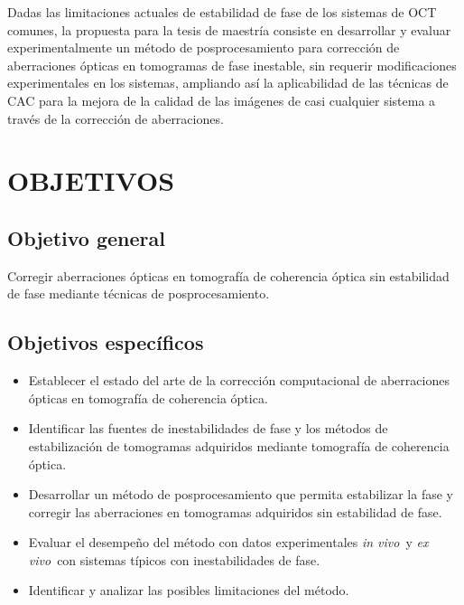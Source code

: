 \documentclass[letter, 12 pt]{article}
\newcommand{\invi}{\textit{in vivo}\ }
\newcommand{\exvi}{\textit{ex vivo}\ }
\begin{document}
Dadas las limitaciones actuales de estabilidad de fase de los sistemas de OCT comunes, la propuesta para la tesis de maestría consiste en desarrollar y evaluar experimentalmente un método de posprocesamiento para corrección de aberraciones ópticas en tomogramas de fase inestable, sin requerir modificaciones experimentales en los sistemas, ampliando así la aplicabilidad de las técnicas de CAC para la mejora de la calidad de las imágenes de casi cualquier sistema a través de la corrección de aberraciones.

\section{OBJETIVOS} \label{sec:objetivos}


\subsection{Objetivo general}

Corregir aberraciones ópticas en tomografía de coherencia óptica sin estabilidad de fase mediante técnicas de posprocesamiento.


\subsection{Objetivos específicos}

\begin{itemize}
    
    \item Establecer el estado del arte de la corrección computacional de aberraciones ópticas en tomografía de coherencia óptica.
    
    \item Identificar las fuentes de inestabilidades de fase y los métodos de estabilización de tomogramas adquiridos mediante tomografía de coherencia óptica.

    \item Desarrollar un método de posprocesamiento que permita estabilizar la fase y corregir las aberraciones en tomogramas adquiridos sin estabilidad de fase.
    
    \item Evaluar el desempeño del método con datos experimentales \invi y \exvi con sistemas típicos con inestabilidades de fase.
    
    \item Identificar y analizar las posibles limitaciones del método.
    
\end{itemize}
\end{document}
